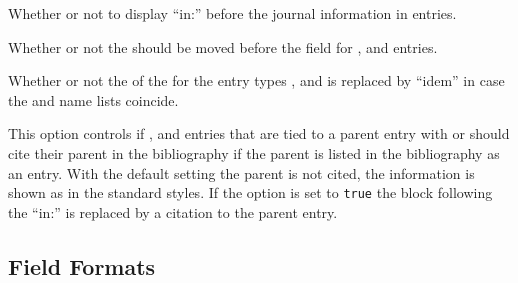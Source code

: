 \documentclass{ltxdockit}
\begin{document}
\begin{optionlist}
Whether or not to display \enquote{in:} before the journal information in
 entries.

Whether or not the  should be moved before the
 field for ,  and
 entries.

Whether or not the  of the 
for the entry types ,  and
 is replaced by \enquote{idem} in case the
 and  name lists coincide.

This option controls if ,  and
 entries that are tied to a parent entry with
 or  should cite their parent in the
bibliography if the parent is listed in the bibliography as an entry.
With the default setting  the parent is not cited, the
information is shown as in the standard styles. If the option is set to 
\texttt{true} the block following the \enquote{in:} is replaced by a citation
to the parent entry.
\end{optionlist}

\subsection{Field Formats}



\end{document}
